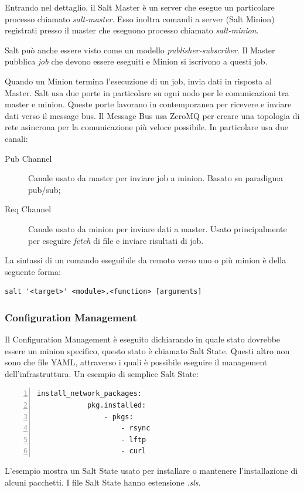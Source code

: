 Entrando nel dettaglio, il Salt Master è un server che esegue un particolare processo chiamato \textit{salt-master}.  Esso inoltra comandi a  server (Salt Minion) registrati presso il master che eseguono processo chiamato \textit{salt-minion}.

Salt può anche essere visto come un modello \textit{publisher-subscriber}. Il Master pubblica \textit{job} che devono essere eseguiti e Minion si iscrivono a questi job.

Quando un Minion termina l'esecuzione di un job, invia dati in risposta al Master. Salt usa due porte in particolare su ogni nodo per le comunicazioni tra master e minion.  Queste porte lavorano in contemporanea per ricevere e inviare dati verso il message bus.
Il Message Bus usa ZeroMQ per creare una topologia di rete asincrona per la comunicazione più veloce possibile.
In particolare usa due canali:
\begin{description}
    \item [Pub Channel] Canale usato da master per inviare job a minion. Basato su paradigma pub/sub;
    \item [Req Channel] Canale usato da minion per inviare dati a master. Usato principalmente per eseguire \textit{fetch} di file e inviare risultati di job.
\end{description}


La sintassi di un comando eseguibile da remoto verso uno  o più minion è della seguente forma:

\begin{center}
\begin{BVerbatim}
salt '<target>' <module>.<function> [arguments]
\end{BVerbatim}
\end{center}
\subsubsection{Configuration Management}
Il Configuration Management è eseguito dichiarando in quale stato dovrebbe essere un minion specifico, questo stato è chiamato Salt State. Questi altro non sono che file YAML, attraverso i quali è possibile eseguire il management dell'infrastruttura.
Un esempio di semplice Salt State:
    \begin{Verbatim}[numbers=left, frame=single, fontsize=\small]
        install_network_packages:
            pkg.installed:
                - pkgs:
                    - rsync
                    - lftp
                    - curl
    \end{Verbatim}
L'esempio  mostra un Salt State usato per installare o mantenere l'installazione di alcuni pacchetti. I file Salt State hanno estensione \textit{.sls}.

